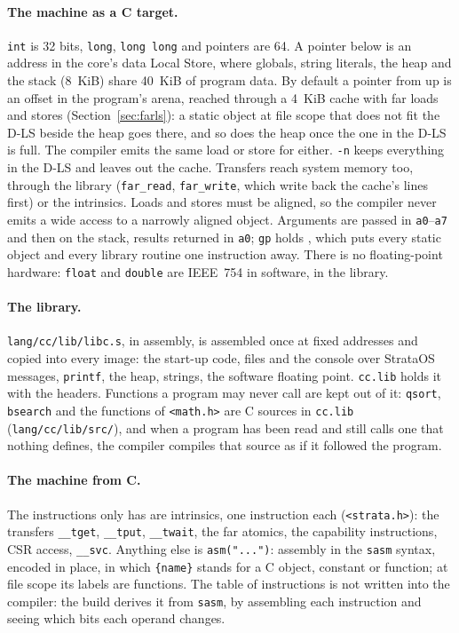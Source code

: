 \paragraph{The machine as a C target.} \texttt{int} is 32 bits, \texttt{long}, \texttt{long long} and
pointers are 64. A pointer below  is an address in the core's data Local Store, where
globals, string literals, the heap and the stack (8~KiB) share 40~KiB of program data. By default a
pointer from  up is an offset in the program's arena, reached through a 4~KiB cache with
far loads and stores (Section~\ref{sec:farls}): a static object at file scope that does not fit the
D-LS beside the heap goes there, and so does the heap once the one in the D-LS is full. The compiler
emits the same load or store for either. \texttt{-n} keeps everything in the D-LS and leaves out the
cache. Transfers reach system memory too, through the library (\texttt{far\_read}, \texttt{far\_write},
which write back the cache's lines first) or the intrinsics.
Loads and stores must be aligned, so the compiler never emits a wide access to a narrowly aligned
object. Arguments are passed in \texttt{a0}--\texttt{a7} and then on the stack, results returned in
\texttt{a0}; \texttt{gp} holds , which puts every static object and every library routine
one instruction away. There is no floating-point hardware: \texttt{float} and \texttt{double} are
IEEE~754 in software, in the library.

\paragraph{The library.} \texttt{lang/cc/lib/libc.s}, in assembly, is assembled once at fixed addresses
and copied into every image: the start-up code, files and the console over StrataOS messages,
\texttt{printf}, the heap, strings, the software floating point. \texttt{cc.lib} holds it with the
headers. Functions a program may never call are kept out of it: \texttt{qsort}, \texttt{bsearch} and
the functions of \texttt{<math.h>} are C sources in \texttt{cc.lib} (\texttt{lang/cc/lib/src/}), and
when a program has been read and still calls one that nothing defines, the compiler compiles that
source as if it followed the program.

\paragraph{The machine from C.} The instructions only \IS has are intrinsics, one instruction each
(\texttt{<strata.h>}): the transfers \texttt{\_\_tget}, \texttt{\_\_tput}, \texttt{\_\_twait}, the far
atomics, the capability instructions, CSR access, \texttt{\_\_svc}. Anything else is
\texttt{asm("...")}: assembly in the \texttt{sasm} syntax, encoded in place, in which
\texttt{\{name\}} stands for a C object, constant or function; at file scope its labels are functions.
The table of instructions is not written into the compiler: the build derives it from \texttt{sasm},
by assembling each instruction and seeing which bits each operand changes.

